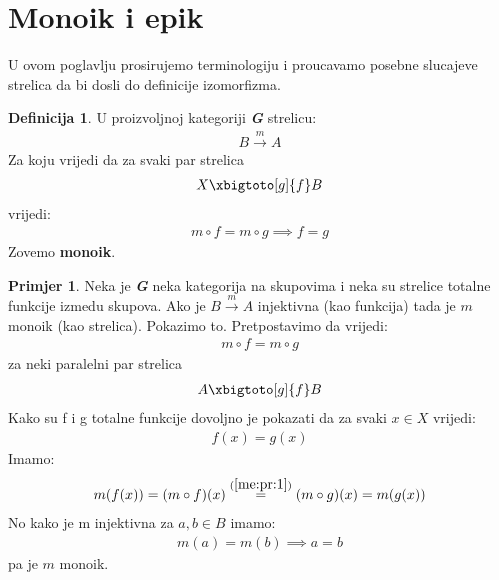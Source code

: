 \documentclass[11pt]{article}
\newcommand{\category}[1]{\textbf{\emph{#1}}}
\theoremstyle{definition}
\newtheorem{definition}{Definicija}
\newtheorem{primjer}{Primjer}
\begin{document}
  \section{Monoik i epik}
  U ovom poglavlju prosirujemo terminologiju i proucavamo posebne slucajeve
  strelica da bi dosli do definicije izomorfizma.
  \begin{definition}
    U proizvoljnoj kategoriji \category{G} strelicu:
    \begin{align*}
      B \xrightarrow{m} A
    \end{align*}
    Za koju vrijedi da za svaki par strelica
    \begin{align*}
      X \xbigtoto[g]{f} B
    \end{align*}
    vrijedi:
    \begin{align}
      m \circ f = m \circ g \implies f = g
    \end{align}
    Zovemo \textbf{monoik}.
  \end{definition}
  \begin{primjer}
    Neka je \category{G} neka kategorija na skupovima i neka su strelice
    totalne funkcije izmedu skupova.
    Ako je $B \xrightarrow{m} A$ injektivna (kao funkcija) tada je $m$ monoik (kao
    strelica). Pokazimo to.
    Pretpostavimo da vrijedi:
    \begin{align} \label{me:pr:1}
      m \circ f = m \circ g
    \end{align}
    za neki paralelni par strelica
    \begin{align*}
      A \xbigtoto[g]{f} B
    \end{align*}
    Kako su f i g totalne funkcije dovoljno je pokazati da za svaki $x \in X$
    vrijedi:
    \begin{align*}
      f(x) = g(x)
    \end{align*}
    Imamo:
    \begin{align*}
      m(f(x)) = (m \circ f)(x) \overset{(\ref{me:pr:1})}{=} (m \circ g)(x) = m(g(x))
    \end{align*}
    No kako je m injektivna za $a, b \in B$ imamo:
    \begin{align*}
      m(a) = m(b) \implies a = b
    \end{align*}
    pa je $m$ monoik.
    \end{primjer}
\end{document}
